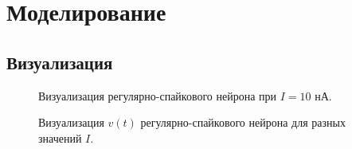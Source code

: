 \chapter{Моделирование}
\label{ch:chap3}


\section{Визуализация}

\begin{figure}[h]
\caption{Визуализация регулярно-спайкового нейрона при $I=10$ нА.}
\label{1_rs}
\end{figure}

\begin{figure}[h]
	\caption{Визуализация $v(t)$ регулярно-спайкового нейрона для разных значений $I$.}
	\label{rs_different_I_potentials}
\end{figure}


